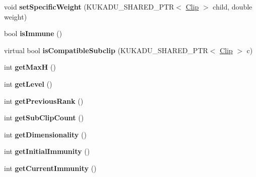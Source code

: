\begin{DoxyCompactItemize}
\item 
void {\bfseries set\+Specific\+Weight} (K\+U\+K\+A\+D\+U\+\_\+\+S\+H\+A\+R\+E\+D\+\_\+\+P\+TR$<$ \hyperlink{classkukadu_1_1Clip}{Clip} $>$ child, double weight)\hypertarget{classkukadu_1_1Clip_a2faf76812c40655ec3bc883aff7c4b5e}{}\label{classkukadu_1_1Clip_a2faf76812c40655ec3bc883aff7c4b5e}

\item 
bool {\bfseries is\+Immune} ()\hypertarget{classkukadu_1_1Clip_a3f1ecbecfc7d21c19e12ccfcafdad8f6}{}\label{classkukadu_1_1Clip_a3f1ecbecfc7d21c19e12ccfcafdad8f6}

\item 
virtual bool {\bfseries is\+Compatible\+Subclip} (K\+U\+K\+A\+D\+U\+\_\+\+S\+H\+A\+R\+E\+D\+\_\+\+P\+TR$<$ \hyperlink{classkukadu_1_1Clip}{Clip} $>$ c)\hypertarget{classkukadu_1_1Clip_a13473decc67ef399684148824adc087c}{}\label{classkukadu_1_1Clip_a13473decc67ef399684148824adc087c}

\item 
int {\bfseries get\+MaxH} ()\hypertarget{classkukadu_1_1Clip_a28731f2656221670acc5447d3781345c}{}\label{classkukadu_1_1Clip_a28731f2656221670acc5447d3781345c}

\item 
int {\bfseries get\+Level} ()\hypertarget{classkukadu_1_1Clip_ab1db78313a620ad816b9225e26bcedfe}{}\label{classkukadu_1_1Clip_ab1db78313a620ad816b9225e26bcedfe}

\item 
int {\bfseries get\+Previous\+Rank} ()\hypertarget{classkukadu_1_1Clip_a0588408a7fef34c3503f3c5236ea01f7}{}\label{classkukadu_1_1Clip_a0588408a7fef34c3503f3c5236ea01f7}

\item 
int {\bfseries get\+Sub\+Clip\+Count} ()\hypertarget{classkukadu_1_1Clip_af77cf93b544392ef68a2cb036073bb5c}{}\label{classkukadu_1_1Clip_af77cf93b544392ef68a2cb036073bb5c}

\item 
int {\bfseries get\+Dimensionality} ()\hypertarget{classkukadu_1_1Clip_abc2dd87e529d55767e168f8cc5544d51}{}\label{classkukadu_1_1Clip_abc2dd87e529d55767e168f8cc5544d51}

\item 
int {\bfseries get\+Initial\+Immunity} ()\hypertarget{classkukadu_1_1Clip_a529397c2adfe87b4d71ff48941e9606e}{}\label{classkukadu_1_1Clip_a529397c2adfe87b4d71ff48941e9606e}

\item 
int {\bfseries get\+Current\+Immunity} ()\hypertarget{classkukadu_1_1Clip_a70b0e249985d664605320bb8bc58b246}{}\label{classkukadu_1_1Clip_a70b0e249985d664605320bb8bc58b246}


\end{DoxyCompactItemize}
